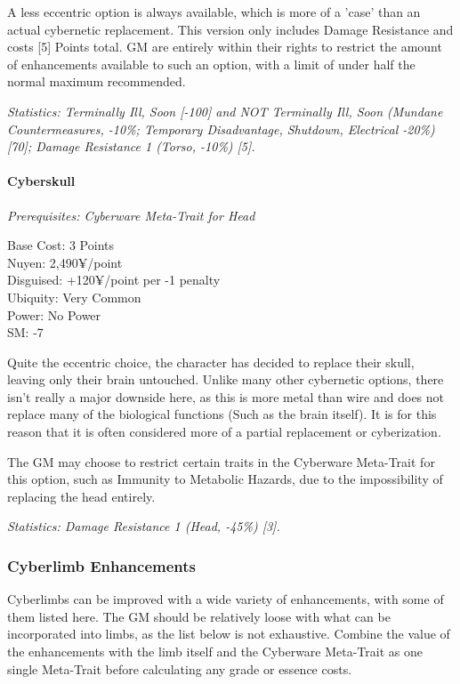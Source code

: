 \begin{multicols*}{3}
	A less eccentric option is always available, which is more of a 'case' than an actual cybernetic replacement. This version only includes Damage Resistance and costs [5] Points total. GM are entirely within their rights to restrict the amount of enhancements available to such an option, with a limit of under half the normal maximum recommended.
	
	\textit{\textcolor{OliveGreen}{Statistics: Terminally Ill, Soon [-100] and NOT Terminally Ill, Soon (Mundane Countermeasures, -10\%; Temporary Disadvantage, Shutdown, Electrical -20\%) [70]; Damage Resistance 1 (Torso, -10\%) [5].}}
	
	\paragraph{Cyberskull}
	\textit{Prerequisites:  Cyberware Meta-Trait for Head}
	\begin{flushright}
		Base Cost: 3 Points\\
		Nuyen: 2,490¥/point\\
		Disguised: +120¥/point per -1 penalty\\
		Ubiquity: Very Common\\
		Power: No Power\\
		SM: -7
	\end{flushright}

	Quite the eccentric choice, the character has decided to replace their skull, leaving only their brain untouched. Unlike many other cybernetic options, there isn't really a major downside here, as this is more metal than wire and does not replace many of the biological functions (Such as the brain itself). It is for this reason that it is often considered more of a partial replacement or cyberization. 
	
	The GM may choose to restrict certain traits in the Cyberware Meta-Trait for this option, such as Immunity to Metabolic Hazards, due to the impossibility of replacing the head entirely.
	
	\textit{\textcolor{OliveGreen}{Statistics: Damage Resistance 1 (Head, -45\%) [3].}}
	
		
	\subsubsection{Cyberlimb Enhancements}
	
	Cyberlimbs can be improved with a wide variety of enhancements, with some of them listed here. The GM should be relatively loose with what can be incorporated into limbs, as the list below is not exhaustive. Combine the value of the enhancements with the limb itself and the Cyberware Meta-Trait as one single Meta-Trait before calculating any grade or essence costs.
	

\end{multicols*}
